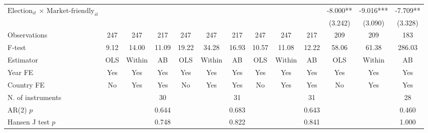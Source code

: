 \begin{longtable}{m{4.5cm}*{12}{c}}
\multirow{2}{4cm}{$\text{Election}_{it}$ $\times$ $\text{Market-friendly}_{it}$}&               &               &               &               &               &               &               &               &               &      -8.000** &      -9.016***&      -7.709** \\
                    &               &               &               &               &               &               &               &               &               &     (3.242)   &     (3.090)   &     (3.328)   \\
\midrule
Observations        &         247   &         247   &         217   &         247   &         247   &         217   &         247   &         247   &         217   &         209   &         209   &         183   \\
F-test              &        9.12   &       14.00   &       11.09   &       19.22   &       34.28   &       16.93   &       10.57   &       11.08   &       12.22   &       58.06   &       61.38   &      286.03   \\
Estimator           &         OLS   &      Within   &          AB   &         OLS   &      Within   &          AB   &         OLS   &      Within   &          AB   &         OLS   &      Within   &          AB   \\
Year FE             &         Yes   &         Yes   &         Yes   &         Yes   &         Yes   &         Yes   &         Yes   &         Yes   &         Yes   &         Yes   &         Yes   &         Yes   \\
Country FE          &          No   &         Yes   &         Yes   &          No   &         Yes   &         Yes   &          No   &         Yes   &         Yes   &          No   &         Yes   &         Yes   \\
N. of instruments   &               &               &          30   &               &               &          31   &               &               &          31   &               &               &          28   \\
AR(2) \(p\)         &               &               &       0.644   &               &               &       0.683   &               &               &       0.643   &               &               &       0.460   \\
Hansen J test \(p\) &               &               &       0.748   &               &               &       0.822   &               &               &       0.841   &               &               &       1.000   \\

\end{longtable}
